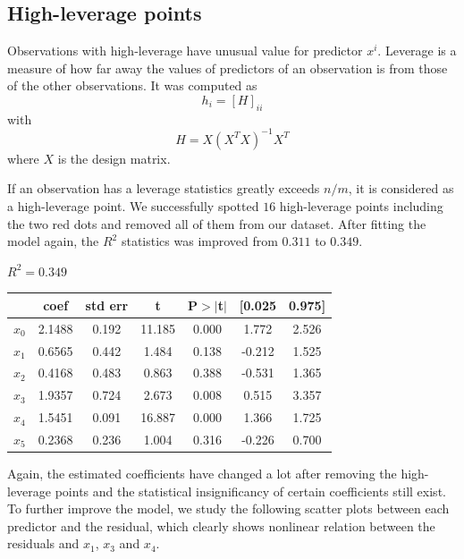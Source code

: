 \documentclass{article}
\begin{document}
\subsection{High-leverage points}

Observations with high-leverage have unusual value for predictor $x^i$. Leverage is a measure of how far away the values of predictors of an observation is from those of the other observations. It was computed as 
$$h_i = [H]_{ii}$$
with $$H = X(X^TX)^{-1}X^T$$
where $X$ is the design matrix.

If an observation has a leverage statistics greatly exceeds $n/m$, it is considered as a high-leverage point. We successfully spotted $16$ high-leverage points including the two red dots and removed all of them from our dataset. After fitting the model again, the $R^2$ statistics was improved from $0.311$ to $0.349$. 

\begin{center}
$R^2 = 0.349$\\
\begin{tabular}{lcccccc}
\hline
           & \textbf{coef} & \textbf{std err} & \textbf{t} & \textbf{P$> |$t$|$} & \textbf{[0.025} & \textbf{0.975]}  \\
\midrule
\textbf{$x_0$} &       2.1488  &        0.192     &    11.185  &         0.000        &        1.772    &        2.526     \\
\textbf{$x_1$} &       0.6565  &        0.442     &     1.484  &         0.138        &       -0.212    &        1.525     \\
\textbf{$x_2$} &       0.4168  &        0.483     &     0.863  &         0.388        &       -0.531    &        1.365     \\
\textbf{$x_3$} &       1.9357  &        0.724     &     2.673  &         0.008        &        0.515    &        3.357     \\
\textbf{$x_4$} &       1.5451  &        0.091     &    16.887  &         0.000        &        1.366    &        1.725     \\
\textbf{$x_5$} &       0.2368  &        0.236     &     1.004  &         0.316        &       -0.226    &        0.700     \\
\bottomrule
\end{tabular}
\end{center}
Again, the estimated coefficients have changed a lot after removing the high-leverage points and the statistical insignificancy of certain coefficients still exist. To further improve the model, we study the following scatter plots between each predictor and the residual, which clearly shows nonlinear relation between the residuals and $x_1$, $x_3$ and $x_4$.
\end{document}
